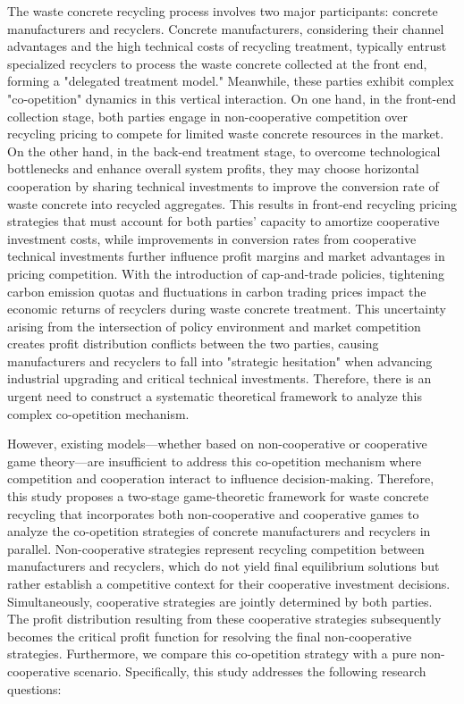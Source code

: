 \documentclass[authoryear,preprint,review,times,10pt]{elsarticle}
\begin{document}
The waste concrete recycling process involves two major participants: concrete manufacturers and recyclers. Concrete manufacturers, considering their channel advantages and the high technical costs of recycling treatment, typically entrust specialized recyclers to process the waste concrete collected at the front end, forming a "delegated treatment model." Meanwhile, these parties exhibit complex "co-opetition" dynamics in this vertical interaction. On one hand, in the front-end collection stage, both parties engage in non-cooperative competition over recycling pricing to compete for limited waste concrete resources in the market. On the other hand, in the back-end treatment stage, to overcome technological bottlenecks and enhance overall system profits, they may choose horizontal cooperation by sharing technical investments to improve the conversion rate of waste concrete into recycled aggregates. This results in front-end recycling pricing strategies that must account for both parties' capacity to amortize cooperative investment costs, while improvements in conversion rates from cooperative technical investments further influence profit margins and market advantages in pricing competition. With the introduction of cap-and-trade policies, tightening carbon emission quotas and fluctuations in carbon trading prices impact the economic returns of recyclers during waste concrete treatment. This uncertainty arising from the intersection of policy environment and market competition creates profit distribution conflicts between the two parties, causing manufacturers and recyclers to fall into "strategic hesitation" when advancing industrial upgrading and critical technical investments. Therefore, there is an urgent need to construct a systematic theoretical framework to analyze this complex co-opetition mechanism.

However, existing models—whether based on non-cooperative or cooperative game theory—are insufficient to address this co-opetition mechanism where competition and cooperation interact to influence decision-making. Therefore, this study proposes a two-stage game-theoretic framework for waste concrete recycling that incorporates both non-cooperative and cooperative games to analyze the co-opetition strategies of concrete manufacturers and recyclers in parallel. Non-cooperative strategies represent recycling competition between manufacturers and recyclers, which do not yield final equilibrium solutions but rather establish a competitive context for their cooperative investment decisions. Simultaneously, cooperative strategies are jointly determined by both parties. The profit distribution resulting from these cooperative strategies subsequently becomes the critical profit function for resolving the final non-cooperative strategies. Furthermore, we compare this co-opetition strategy with a pure non-cooperative scenario. Specifically, this study addresses the following research questions:
\end{document}
